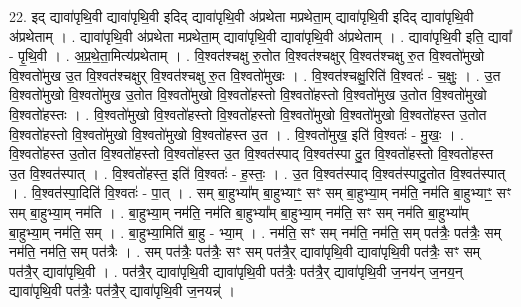\documentclass[17pt]{extarticle}
\begin{document}
22. इद् द्यावा॑पृथि॒वी द्यावा॑पृथि॒वी इदिद् द्यावा॑पृथि॒वी अ॑प्रथेता मप्रथेता॒म् द्यावा॑पृथि॒वी इदिद् द्यावा॑पृथि॒वी अ॑प्रथेताम् । . द्यावा॑पृथि॒वी अ॑प्रथेता मप्रथेता॒म् द्यावा॑पृथि॒वी द्यावा॑पृथि॒वी अ॑प्रथेताम् । . द्यावा॑पृथि॒वी इति॒ द्यावा᳚ - पृ॒थि॒वी । . अ॒प्र॒थे॒ता॒मित्य॑प्रथेताम् । . वि॒श्वत॑श्चक्षु रु॒तोत वि॒श्वत॑श्चक्षुर् वि॒श्वत॑श्चक्षु रु॒त वि॒श्वतो॑मुखो वि॒श्वतो॑मुख उ॒त वि॒श्वत॑श्चक्षुर् वि॒श्वत॑श्चक्षु रु॒त वि॒श्वतो॑मुखः । . वि॒श्वत॑श्चक्षु॒रिति॑ वि॒श्वतः॑ - च॒क्षुः॒ । . उ॒त वि॒श्वतो॑मुखो वि॒श्वतो॑मुख उ॒तोत वि॒श्वतो॑मुखो वि॒श्वतो॑हस्तो वि॒श्वतो॑हस्तो वि॒श्वतो॑मुख उ॒तोत वि॒श्वतो॑मुखो वि॒श्वतो॑हस्तः । . वि॒श्वतो॑मुखो वि॒श्वतो॑हस्तो वि॒श्वतो॑हस्तो वि॒श्वतो॑मुखो वि॒श्वतो॑मुखो वि॒श्वतो॑हस्त उ॒तोत वि॒श्वतो॑हस्तो वि॒श्वतो॑मुखो वि॒श्वतो॑मुखो वि॒श्वतो॑हस्त उ॒त । . वि॒श्वतो॑मुख॒ इति॑ वि॒श्वतः॑ - मु॒खः॒ । . वि॒श्वतो॑हस्त उ॒तोत वि॒श्वतो॑हस्तो वि॒श्वतो॑हस्त उ॒त वि॒श्वत॑स्पाद् वि॒श्वत॑स्पा दु॒त वि॒श्वतो॑हस्तो वि॒श्वतो॑हस्त उ॒त वि॒श्वत॑स्पात् । . वि॒श्वतो॑हस्त॒ इति॑ वि॒श्वतः॑ - ह॒स्तः॒ । . उ॒त वि॒श्वत॑स्पाद् वि॒श्वत॑स्पादु॒तोत वि॒श्वत॑स्पात् । . वि॒श्वत॑स्पा॒दिति॑ वि॒श्वतः॑ - पा॒त् । . सम् बा॒हुभ्या᳚म् बा॒हुभ्याꣳ॒॒ सꣳ सम् बा॒हुभ्या॒म् नम॑ति॒ नम॑ति बा॒हुभ्याꣳ॒॒ सꣳ सम् बा॒हुभ्या॒म् नम॑ति । . बा॒हुभ्या॒म् नम॑ति॒ नम॑ति बा॒हुभ्या᳚म् बा॒हुभ्या॒म् नम॑ति॒ सꣳ सम् नम॑ति बा॒हुभ्या᳚म् बा॒हुभ्या॒म् नम॑ति॒ सम् । . बा॒हुभ्या॒मिति॑ बा॒हु - भ्या॒म् । . नम॑ति॒ सꣳ सम् नम॑ति॒ नम॑ति॒ सम् पत॑त्रैः॒ पत॑त्रैः॒ सम् नम॑ति॒ नम॑ति॒ सम् पत॑त्रैः । . सम् पत॑त्रैः॒ पत॑त्रैः॒ सꣳ सम् पत॑त्रै॒र् द्यावा॑पृथि॒वी द्यावा॑पृथि॒वी पत॑त्रैः॒ सꣳ सम् पत॑त्रै॒र् द्यावा॑पृथि॒वी । . पत॑त्रै॒र् द्यावा॑पृथि॒वी द्यावा॑पृथि॒वी पत॑त्रैः॒ पत॑त्रै॒र् द्यावा॑पृथि॒वी ज॒नय॑न् ज॒नय॒न् द्यावा॑पृथि॒वी पत॑त्रैः॒ पत॑त्रै॒र् द्यावा॑पृथि॒वी ज॒नयन्न्॑ । \newline
\end{document}
